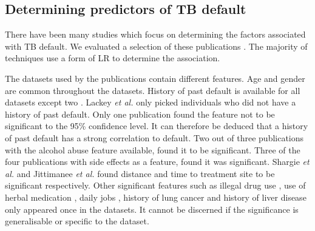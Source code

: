 \documentclass{sig-alternate-05-2015}
\begin{document}
	\subsection{Determining predictors of TB default}
	\label{predictors_of_defaulters_related_work}
	There have been many studies which focus on determining the factors associated with TB default. We evaluated a selection of these publications \cite{chan:2003prevalence, Jha:10.1371/journal.pone.0008873, jittimanee:10.1111/j.1440-172X.2007.00650.x, Lackey:10356751520150601, muture:6660173120110101, Shargie:10.1371/journal.pmed.0040037}. The majority of techniques use a form of LR to determine the association. 
	
	The datasets used by the publications contain different features. Age and gender are common throughout the datasets. History of past default is available for all datasets except two \cite{Shargie:10.1371/journal.pmed.0040037, Lackey:10356751520150601}. Lackey \textit{et al.} \cite{Lackey:10356751520150601} only picked individuals who did not have a history of past default. Only one publication \cite{jittimanee:10.1111/j.1440-172X.2007.00650.x} found the feature not to be significant to the 95\% confidence level. It can therefore be deduced that a history of past default has a strong correlation to default. Two out of three publications with the alcohol abuse feature available, found it to be significant. Three of the four publications with side effects as a feature, found it was significant. Shargie \textit{et al.} \cite{Shargie:10.1371/journal.pmed.0040037} and Jittimanee \textit{et al.} \cite{jittimanee:10.1111/j.1440-172X.2007.00650.x} found distance and time to treatment site to be significant respectively. Other significant features such as illegal drug use \cite{Lackey:10356751520150601}, use of herbal medication \cite{muture:6660173120110101}, daily jobs \cite{jittimanee:10.1111/j.1440-172X.2007.00650.x}, history of lung cancer \cite{chan:2003prevalence} and history of liver disease \cite{chan:2003prevalence} only appeared once in the datasets. It cannot be discerned if the significance is generalisable or specific to the dataset. 
	
\end{document}
